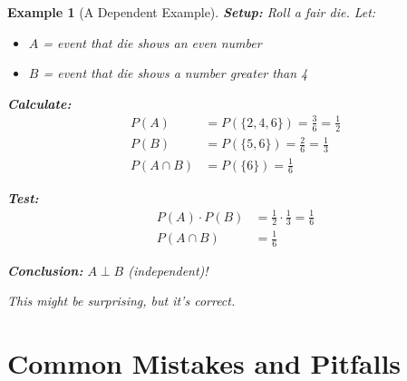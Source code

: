 \documentclass[11pt]{article}
\newtheorem{example}{Example}
\begin{document}
\begin{example}[A Dependent Example]
\textbf{Setup:} Roll a fair die. Let:
\begin{itemize}
    \item $A$ = event that die shows an even number
    \item $B$ = event that die shows a number greater than 4
\end{itemize}

\textbf{Calculate:}
\begin{align*}
P(A) &= P(\{2, 4, 6\}) = \frac{3}{6} = \frac{1}{2}\\
P(B) &= P(\{5, 6\}) = \frac{2}{6} = \frac{1}{3}\\
P(A \cap B) &= P(\{6\}) = \frac{1}{6}
\end{align*}

\textbf{Test:}
\begin{align*}
P(A) \cdot P(B) &= \frac{1}{2} \cdot \frac{1}{3} = \frac{1}{6}\\
P(A \cap B) &= \frac{1}{6}
\end{align*}

\textbf{Conclusion:} $A \perp B$ (independent)!

This might be surprising, but it's correct.
\end{example}

\section{Common Mistakes and Pitfalls}
\end{document}

